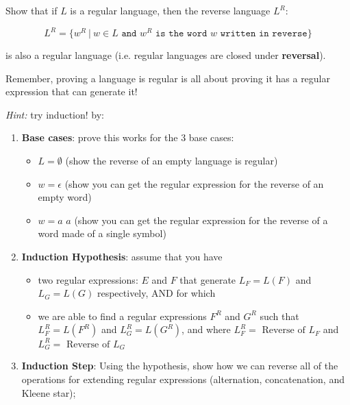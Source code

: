 \documentclass[12pt]{article}
\newenvironment{exercise}[2][Exercise]{\begin{trivlist}
\item[\hskip \labelsep {\bfseries #1}\hskip \labelsep {\bfseries #2.}]}{\end{trivlist}}
\begin{document}
\clearpage

\begin{exercise}{4}

Show that if $L$ is a regular language, then the reverse language $L^R$:

$$L^R = \{w^R \ | \ w\in L \texttt{ and } w^R \texttt{ is the word } w \texttt{ written in reverse}\}$$

is also a regular language (i.e. regular languages are closed under \textbf{reversal}).

Remember, proving a language is regular is all about proving it has a regular expression that can generate it!

{\Large \textit{Hint: }}
 try induction! by:
\begin{enumerate}
    \item \textbf{Base cases}: prove this works for the 3 base cases:
    \begin{itemize}
        \item $L =\emptyset$ (show the reverse of an empty language is regular)
        \item $w=\epsilon$ (show you can get the regular expression for the reverse of an empty word)
        \item $w=a$  $a$ (show you can get the regular expression for the reverse of a word made of a single symbol)
    \end{itemize}
    \item\textbf{ Induction Hypothesis}: assume that you have 
    \begin{itemize}
        \item two regular expressions: $E$ and $F$ that generate $L_F = L(F)$ and $L_G = L(G)$ respectively, AND for which
        \item we are able to find a regular expressions $F^R$ and $G^R$ such that  $L^R_F = L(F^R)$ and $L^R_G = L(G^R)$, and where $L^R_F = \text{ Reverse of } L_F$ and $L^R_G = \text{ Reverse of } L_G$
    \end{itemize}

    \item \textbf{Induction Step}: Using the hypothesis, show how we can reverse all of the operations for extending regular expressions (alternation, concatenation, and Kleene star); 
\end{enumerate}

\end{exercise}
\end{document}
